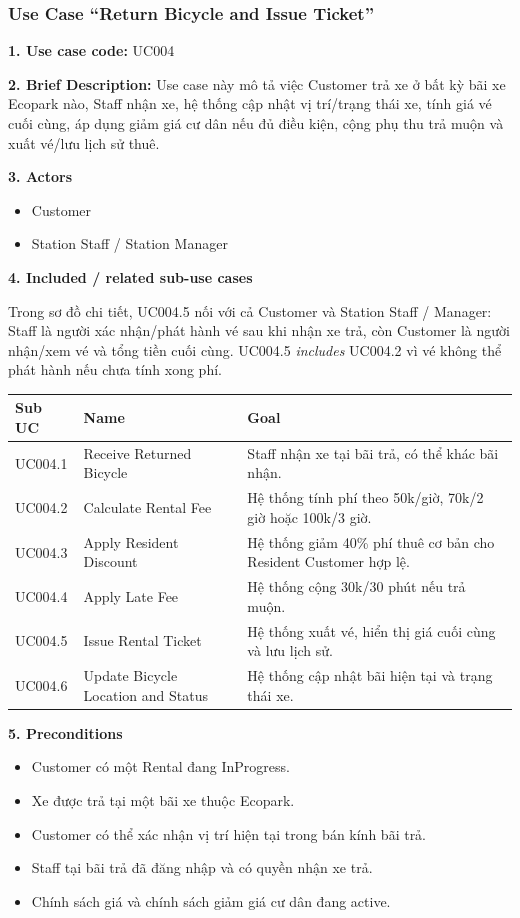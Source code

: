 \newpage
\subsubsection{Use Case ``Return Bicycle and Issue Ticket''}

\textbf{1. Use case code:} UC004

\textbf{2. Brief Description:} Use case này mô tả việc Customer trả xe ở bất kỳ
bãi xe Ecopark nào, Staff nhận xe, hệ thống cập nhật vị trí/trạng thái xe, tính
giá vé cuối cùng, áp dụng giảm giá cư dân nếu đủ điều kiện, cộng phụ thu trả muộn
và xuất vé/lưu lịch sử thuê.

\textbf{3. Actors}
\begin{itemize}
  \item Customer
  \item Station Staff / Station Manager
\end{itemize}

\textbf{4. Included / related sub-use cases}

Trong sơ đồ chi tiết, UC004.5 nối với cả Customer và Station Staff / Manager:
Staff là người xác nhận/phát hành vé sau khi nhận xe trả, còn Customer là người
nhận/xem vé và tổng tiền cuối cùng. UC004.5 \textit{includes} UC004.2 vì vé
không thể phát hành nếu chưa tính xong phí.

\begin{longtable}{P{0.18\textwidth}P{0.30\textwidth}P{0.42\textwidth}}
\toprule
\textbf{Sub UC} & \textbf{Name} & \textbf{Goal} \\
\midrule
UC004.1 & Receive Returned Bicycle & Staff nhận xe tại bãi trả, có thể khác bãi nhận. \\
UC004.2 & Calculate Rental Fee & Hệ thống tính phí theo 50k/giờ, 70k/2 giờ hoặc 100k/3 giờ. \\
UC004.3 & Apply Resident Discount & Hệ thống giảm 40\% phí thuê cơ bản cho Resident Customer hợp lệ. \\
UC004.4 & Apply Late Fee & Hệ thống cộng 30k/30 phút nếu trả muộn. \\
UC004.5 & Issue Rental Ticket & Hệ thống xuất vé, hiển thị giá cuối cùng và lưu lịch sử. \\
UC004.6 & Update Bicycle Location and Status & Hệ thống cập nhật bãi hiện tại và trạng thái xe. \\
\bottomrule
\end{longtable}

\textbf{5. Preconditions}
\begin{itemize}
  \item Customer có một Rental đang InProgress.
  \item Xe được trả tại một bãi xe thuộc Ecopark.
  \item Customer có thể xác nhận vị trí hiện tại trong bán kính bãi trả.
  \item Staff tại bãi trả đã đăng nhập và có quyền nhận xe trả.
  \item Chính sách giá và chính sách giảm giá cư dân đang active.
\end{itemize}

